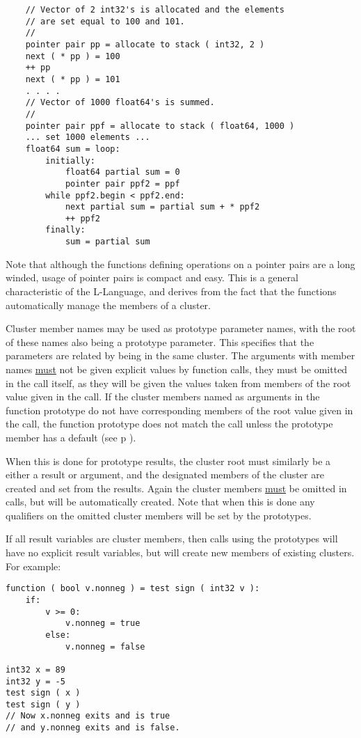 \documentclass[12pt]{article}
\newcommand{\pagref}[1]{p\pageref{#1}}
\newenvironment{indpar}[1][0.3in]%
	{\begin{list}{}%
		     {\setlength{\itemsep}{0in}%
		      \setlength{\topsep}{0in}%
		      \setlength{\parsep}{1ex}%
		      \setlength{\labelwidth}{#1}%
		      \setlength{\leftmargin}{#1}%
		      \addtolength{\leftmargin}{\labelsep}}%
	 \item}%
	{\end{list}}
\begin{document}
\begin{indpar}
\begin{verbatim}
    // Vector of 2 int32's is allocated and the elements
    // are set equal to 100 and 101.
    //
    pointer pair pp = allocate to stack ( int32, 2 )
    next ( * pp ) = 100
    ++ pp
    next ( * pp ) = 101
    . . . .
    // Vector of 1000 float64's is summed.
    //
    pointer pair ppf = allocate to stack ( float64, 1000 )
    ... set 1000 elements ...
    float64 sum = loop:
        initially:
            float64 partial sum = 0
            pointer pair ppf2 = ppf
        while ppf2.begin < ppf2.end:
            next partial sum = partial sum + * ppf2
            ++ ppf2
        finally:
            sum = partial sum
\end{verbatim}\end{indpar}\label{NEXT-CLUSTER-BASE-EXAMPLE}

Note that although the functions defining operations on a pointer pairs
are a long winded, usage of pointer pairs is compact and easy.
This is a general characteristic of the L-Language, and derives
from the fact that the functions automatically manage the members
of a cluster.

Cluster member names may be used as prototype parameter
names, with the root of these names also being a prototype
parameter.  This specifies that the parameters are related
by being in the same cluster.  The arguments with member names
\underline{must} not be given explicit values by function calls,
they must be omitted in the call itself, as they will be given
the values taken from members of the root value given in the call.
If the cluster members named as arguments
in the function prototype do not have corresponding members of the
root value given in the call,
the function prototype does not match the call unless the prototype
member has a default (see \pagref{DEFAULTS-TO} ).

When this is done for prototype results, the cluster root must similarly
be a either a result or argument, and the designated
members of the cluster are created and set from the results.
Again the cluster members \underline{must} be omitted in calls,
but will be automatically created.
Note that when this is done any qualifiers on the omitted cluster
members will be set by the prototypes.

If all result variables are cluster members, then calls
using the prototypes will have no explicit result variables,
but will create new members of existing clusters.  For example:
\begin{indpar}\begin{verbatim}
function ( bool v.nonneg ) = test sign ( int32 v ):
    if:
        v >= 0:
            v.nonneg = true
        else:
            v.nonneg = false

int32 x = 89
int32 y = -5
test sign ( x )
test sign ( y )
// Now x.nonneg exits and is true
// and y.nonneg exits and is false.
\end{verbatim}\end{indpar}
\end{document}
